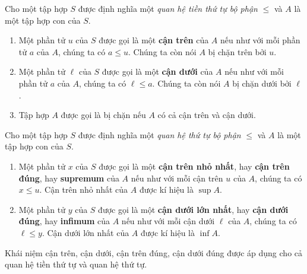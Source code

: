 \begin{definition}
    Cho một tập hợp $S$ được định nghĩa một \textit{quan hệ tiền thứ tự bộ phận} $\leq$ và $A$ là một tập hợp con của $S$.
    \begin{enumerate}[label={(\roman*)}]
        \item Một phần tử $u$ của $S$ được gọi là một \textbf{cận trên} của $A$ nếu như với mỗi phần tử $a$ của $A$, chúng ta có $a\leq u$. Chúng ta còn nói $A$ bị chặn trên bởi $u$.
        \item Một phần tử $\ell$ của $S$ được gọi là một \textbf{cận dưới} của $A$ nếu như với mỗi phần tử $a$ của $A$, chúng ta có $\ell\leq a$. Chúng ta còn nói $A$ bị chặn dưới bởi $\ell$.
        \item Tập hợp $A$ được gọi là bị chặn nếu $A$ có cả cận trên và cận dưới.
    \end{enumerate}
\end{definition}

\begin{definition}
    Cho một tập hợp $S$ được định nghĩa một \textit{quan hệ thứ tự bộ phận} $\leq$ và $A$ là một tập hợp con của $S$.
    \begin{enumerate}[label={(\roman*)}]
        \item Một phần tử $x$ của $S$ được gọi là một \textbf{cận trên nhỏ nhất}, hay \textbf{cận trên đúng}, hay \textbf{supremum} của $A$ nếu như với mỗi cận trên $u$ của $A$, chúng ta có $x\leq u$. Cận trên nhỏ nhất của $A$ được kí hiệu là $\sup A$.
        \item Một phần tử $y$ của $S$ được gọi là một \textbf{cận dưới lớn nhất}, hay \textbf{cận dưới đúng}, hay \textbf{infimum} của $A$ nếu như với mỗi cận dưới $\ell$ của $A$, chúng ta có $\ell\leq y$. Cận dưới lớn nhất của $A$ được kí hiệu là $\inf A$.
    \end{enumerate}
\end{definition}

Khái niệm cận trên, cận dưới, cận trên đúng, cận dưới đúng được áp dụng cho cả quan hệ tiền thứ tự và quan hệ thứ tự.

